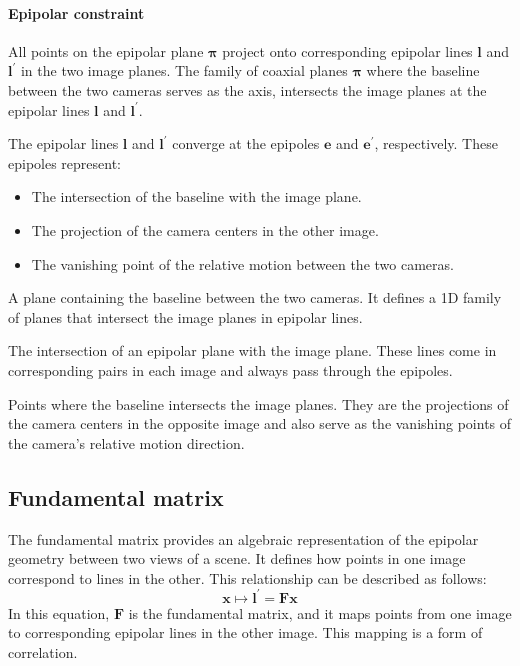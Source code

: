 \paragraph*{Epipolar constraint}
All points on the epipolar plane $\boldsymbol{\pi}$ project onto corresponding epipolar lines $\mathbf{l}$ and $\mathbf{l}^\prime$ in the two image planes.
The family of coaxial planes $\boldsymbol{\pi}$ where the baseline between the two cameras serves as the axis, intersects the image planes at the epipolar lines $\mathbf{l}$ and $\mathbf{l}^\prime$. 

The epipolar lines $\mathbf{l}$ and $\mathbf{l}^\prime$ converge at the epipoles $\mathbf{e}$ and $\mathbf{e}^\prime$, respectively.
These epipoles represent: 
\begin{itemize}
    \item The intersection of the baseline with the image plane.
    \item The projection of the camera centers in the other image.
    \item The vanishing point of the relative motion between the two cameras.
\end{itemize}

\begin{definition}
    A plane containing the baseline between the two cameras. 
    It defines a 1D family of planes that intersect the image planes in epipolar lines.
\end{definition}
\begin{definition}
    The intersection of an epipolar plane with the image plane. 
    These lines come in corresponding pairs in each image and always pass through the epipoles.
\end{definition}
\begin{definition}
    Points where the baseline intersects the image planes. 
    They are the projections of the camera centers in the opposite image and also serve as the vanishing points of the camera's relative motion direction.
\end{definition}

\subsection{Fundamental matrix}
The fundamental matrix provides an algebraic representation of the epipolar geometry between two views of a scene. 
It defines how points in one image correspond to lines in the other. This relationship can be described as follows:
\[\mathbf{x}\mapsto \mathbf{l}^\prime=\mathbf{Fx}\]
In this equation, $\mathbf{F}$ is the fundamental matrix, and it maps points from one image to corresponding epipolar lines in the other image.
This mapping is a form of correlation.

